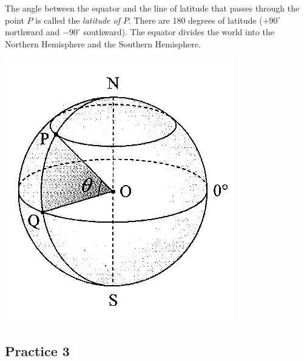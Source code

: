 \documentclass{report}
\begin{document}
\begin{multicols}{2}
    The angle between the equator and the line of latitude that passes through the
    point $P$ is called the \emph{latitude of $P$}. There are 180 degrees of
    latitude ($+90^\circ$ northward and $-90^\circ$ southward). The equator divides
    the world into the Northern Hemisphere and the Southern Hemisphere.

    \begin{center}
        \includegraphics[scale=1.3]{latitude 2.png}
    \end{center}

    \subsection{Practice 3}


\end{multicols}
\end{document}
